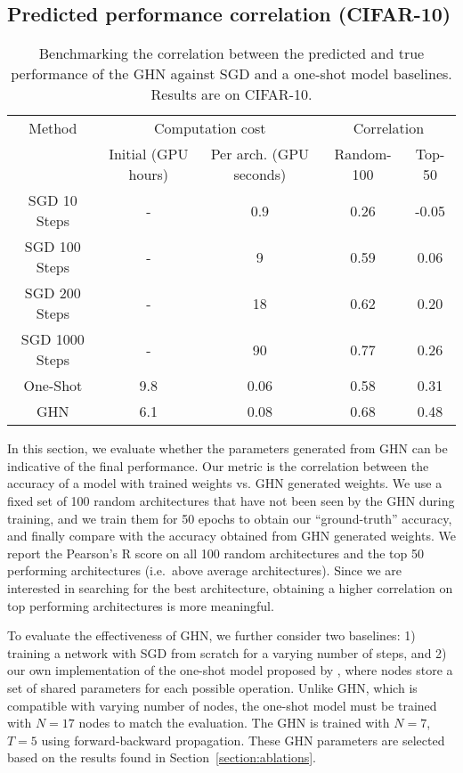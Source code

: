 \subsection{Predicted performance correlation (CIFAR-10)}
\begin{table}[t]
\caption{Benchmarking the correlation between the predicted and true performance of the GHN against SGD and a one-shot model baselines. Results are on CIFAR-10.}
\vspace{-0.2cm}
\label{table:correlation}
\small
\begin{center}
\begin{tabular}{ c c c c c} 
Method & \multicolumn{2}{c}{Computation cost}   & \multicolumn{2}{c}{Correlation}    \\ 
 & Initial (GPU hours) & Per arch. (GPU seconds)  & Random-100 & Top-50   \\ 
\hline
SGD 10 Steps & - & 0.9 & 0.26 & -0.05\\
SGD 100 Steps & - & 9 & 0.59 & 0.06\\
SGD 200 Steps & - & 18 & 0.62 & 0.20 \\
SGD 1000 Steps & - & 90 & 0.77 & 0.26 \\
One-Shot & 9.8 & 0.06 & 0.58 & 0.31\\
\hline
\hline
GHN & 6.1 & 0.08 & 0.68 & 0.48
\end{tabular}
\end{center}
\end{table}

In this section, we evaluate  whether the parameters generated from GHN can be indicative of the
final performance. Our metric is the correlation between the accuracy of a model with trained
weights vs. GHN generated weights. We use a fixed set of 100 random architectures that have not been
seen by the GHN during training, and we train them for 50 epochs to obtain our ``ground-truth''
accuracy, and finally compare with the accuracy obtained from GHN generated weights. We report the
Pearson's R score on all 100 random architectures and the top 50 performing architectures (i.e.\
above average architectures). Since we are interested in searching for the best architecture,
obtaining a higher correlation on top performing architectures is more meaningful.

To evaluate the effectiveness of GHN, we further consider two baselines: 1) training a network with
SGD from scratch for a varying number of steps, and 2) our own implementation of the one-shot model
proposed by \citet{pham2018efficient}, where nodes store a set of shared parameters for each
possible operation. Unlike GHN, which is compatible with varying number of nodes, the one-shot model
must be trained with $N=17$ nodes to match the evaluation. The GHN is trained with $N=7$, $T=5$
using forward-backward propagation. These GHN parameters are selected based on the results found in
Section~\ref{section:ablations}.

